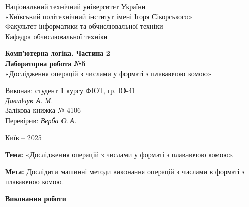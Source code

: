 \documentclass[12pt,a4paper]{article}
\begin{document}
    \begin{titlepage}

        \thispagestyle{empty}
        \begin{center}
        \large
        Національний технічний університет України\\
        «Київський політехнічний інститут імені Ігоря Сікорського»\\[1em]
        Факультет інформатики та обчислювальної техніки\\
        Кафедра обчислювальної техніки
        \end{center}

        \vfill

        \begin{center}
        \textbf{\LARGE Комп'ютерна логіка. Частина 2}\\[2em]
        \textbf{\Large Лабораторна робота №5}\\
        «Дослідження операцій з числами у форматі з плаваючою комою» 
        \end{center}

        \vfill

        \begin{flushright}
        Виконав: студент 1 курсу ФІОТ, гр. ІО-41\\
        \textit{Давидчук А. М.}\\
        Залікова книжка № 4106\\[1em]
        Перевірив: \textit{Верба О.\,А.}
        \end{flushright}

        \vfill

        \begin{center}
        Київ -- 2025
        \end{center}

    \end{titlepage}

    \setlength{\parindent}{0pt}

    \textbf{\underline{Тема:}} «Дослідження операцій з числами у форматі з плаваючою комою».

    \vspace{1em}
    
    \textbf{\underline{Мета:}} Дослідити машинні методи виконання операцій з числами в форматі з плаваючою комою.

    \begin{center} \textbf{\large Виконання роботи} \end{center}
\end{document}
